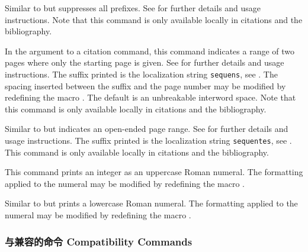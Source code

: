 \begin{ltxsyntax}

Similar to  but suppresses all prefixes. See  for further details and usage instructions. Note that this command is only available locally in citations and the bibliography.


In the  argument to a citation command, this command indicates a range of two pages where only the starting page is given. See  for further details and usage instructions. The suffix printed is the localization string \texttt{sequens}, see . The spacing inserted between the suffix and the page number may be modified by redefining the macro . The default is an unbreakable interword space. Note that this command is only available locally in citations and the bibliography.


Similar to  but indicates an open-ended page range. See  for further details and usage instructions. The suffix printed is the localization string \texttt{sequentes}, see . This command is only available locally in citations and the bibliography.


This command prints an integer as an uppercase Roman numeral. The formatting applied to the numeral may be modified by redefining the macro .


Similar to  but prints a lowercase Roman numeral. The formatting applied to the numeral may be modified by redefining the macro .

\end{ltxsyntax}

\subsubsection{与兼容的命令  Compatibility Commands}
\label{use:cit:nat}

